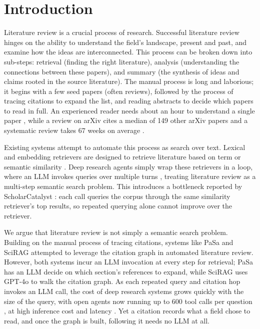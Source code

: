 \section{Introduction}
\label{sec:introduction}

Literature review is a crucial process of research. Successful literature review hinges on the ability to understand the field's landscape, present and past, and examine how the ideas are interconnected. This process can be broken down into sub-steps: retrieval (finding the right literature), analysis (understanding the connections between these papers), and summary (the synthesis of ideas and claims rooted in the source literature). The manual process is long and laborious; it begins with a few seed papers (often reviews), followed by the process of tracing citations to expand the list, and reading abstracts to decide which papers to read in full. An experienced reader needs about an hour to understand a single paper \citep{keshav2007read}, while a review on arXiv cites a median of 149 other arXiv papers and a systematic review takes 67 weeks on average \citep{huotala2024screening}.

Existing systems attempt to automate this process as search over text. Lexical and embedding retrievers are designed to retrieve literature based on term or semantic similarity \citep{robertson2009bm25,singh2022scirepeval,ostendorff2022scincl}. Deep research agents simply wrap these retrievers in a loop, where an LLM invokes queries over multiple turns \citep{he2025pasa,tongyi2025deepresearch,li2025webthinker,mirothinker2025}, treating literature review as a multi-step semantic search problem. This introduces a bottleneck reported by ScholarCatalyst \citep{kim2026scholarcatalyst}: each call queries the corpus through the same similarity retriever's top results, so repeated querying alone cannot improve over the retriever.

We argue that literature review is not simply a semantic search problem. Building on the manual process of tracing citations, systems like PaSa \citep{he2025pasa} and SciRAG \citep{ding2025scirag} attempted to leverage the citation graph in automated literature review. However, both systems incur an LLM invocation at every step for retrieval; PaSa has an LLM decide on which section's references to expand, while SciRAG uses GPT-4o to walk the citation graph. As each repeated query and citation hop invokes an LLM call, the cost of deep research systems grows quickly with the size of the query, with open agents now running up to 600 tool calls per question \citep{mirothinker2025}, at high inference cost and latency \citep{chen2026searchmore}. Yet a citation records what a field chose to read, and once the graph is built, following it needs no LLM at all.

